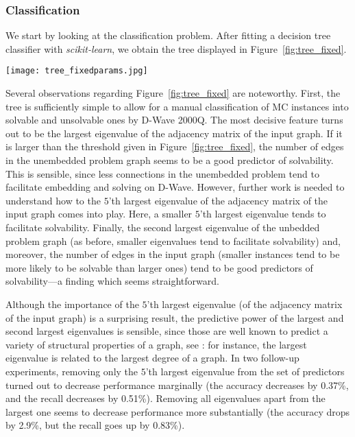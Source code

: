 \documentclass[a4paper,11pt]{article}
\begin{document}
\subsubsection{Classification}
We start by looking at the classification problem. After fitting a decision tree classifier with \textit{scikit-learn}, we obtain the tree displayed in Figure~\ref{fig:tree_fixed}.

\begin{figure*}
    \centering
    \texttt{[image: tree\_fixedparams.jpg]}
    \caption{Decision tree for classification of MC instances into solvable and unsolvable, using the features outlined in Section~\ref{sec:methods}. Setting of fixed annealing time and fixed UTC prefactor. Left branches denote \textit{true} bifurcations, right branches denote \textit{false} bifurcations. Green leaves are solvable cases, red leaves are unsolvable cases, and inner nodes are colored in blue.\label{fig:tree_fixed}}
\end{figure*}
Several observations regarding Figure~\ref{fig:tree_fixed} are noteworthy. First, the tree is sufficiently simple to allow for a manual classification of MC instances into solvable and unsolvable ones by D-Wave 2000Q. The most decisive feature turns out to be the largest eigenvalue of the adjacency matrix of the input graph. If it is larger than the threshold given in Figure~\ref{fig:tree_fixed}, the number of edges in the unembedded problem graph seems to be a good predictor of solvability. This is sensible, since less connections in the unembedded problem tend to facilitate embedding and solving on D-Wave. However, further work is needed to understand how to the $5$'th largest eigenvalue of the adjacency matrix of the input graph comes into play. Here, a smaller $5$'th largest eigenvalue tends to facilitate solvability. Finally, the second largest eigenvalue of the unbedded problem graph (as before, smaller eigenvalues tend to facilitate solvability) and, moreover, the number of edges in the input graph (smaller instances tend to be more likely to be solvable than larger ones) tend to be good predictors of solvability---a finding which seems straightforward.

Although the importance of the $5$'th largest eigenvalue (of the adjacency matrix of the input graph) is a surprising result, the predictive power of the largest and second largest eigenvalues is sensible, since those are well known to predict a variety of structural properties of a graph, see \cite{Cvetkovic1995, lovasz}: for instance, the largest eigenvalue is related to the largest degree of a graph. In two follow-up experiments, removing only the $5$'th largest eigenvalue from the set of predictors turned out to decrease performance marginally (the accuracy decreases by 0.37\%, and the recall decreases by 0.51\%). Removing all eigenvalues apart from the largest one seems to decrease performance more substantially (the accuracy drops by 2.9\%, but the recall goes up by 0.83\%).
\end{document}
